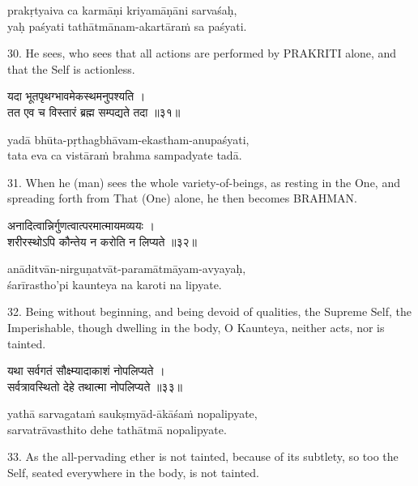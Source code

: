 \begin{transliteration}
prakṛtyaiva ca karmāṇi kriyamāṇāni sarvaśaḥ, \\
yaḥ paśyati tathātmānam-akartāraṁ sa paśyati.
\end{transliteration}

30. He sees, who sees that all actions are performed by PRAKRITI alone, and
that the Self is actionless.

\begin{gitaverse}
यदा भूतपृथग्भावमेकस्थमनुपश्यति । \\
तत एव च विस्तारं ब्रह्म सम्पद्यते तदा ॥३१॥
\end{gitaverse}

\begin{transliteration}
yadā bhūta-pṛthagbhāvam-ekastham-anupaśyati, \\
tata eva ca vistāraṁ brahma sampadyate tadā.
\end{transliteration}

31. When he (man) sees the whole variety-of-beings, as resting in the One, and
spreading forth from That (One) alone, he then becomes BRAHMAN.\@

\begin{gitaverse}
अनादित्वान्निर्गुणत्वात्परमात्मायमव्ययः । \\
शरीरस्थोऽपि कौन्तेय न करोति न लिप्यते ॥३२॥
\end{gitaverse}

\begin{transliteration}
anāditvān-nirguṇatvāt-paramātmāyam-avyayaḥ, \\
śarīrastho'pi kaunteya na karoti na lipyate.
\end{transliteration}

32. Being without beginning, and being devoid of qualities, the Supreme Self,
the Imperishable, though dwelling in the body, O Kaunteya, neither acts, nor is
tainted.

\begin{gitaverse}
यथा सर्वगतं सौक्ष्म्यादाकाशं नोपलिप्यते । \\
सर्वत्रावस्थितो देहे तथात्मा नोपलिप्यते ॥३३॥
\end{gitaverse}

\begin{transliteration}
yathā sarvagataṁ saukṣmyād-ākāśaṁ nopalipyate, \\
sarvatrāvasthito dehe tathātmā nopalipyate.
\end{transliteration}

33. As the all-pervading ether is not tainted, because of its subtlety, so too
the Self, seated everywhere in the body, is not tainted.

